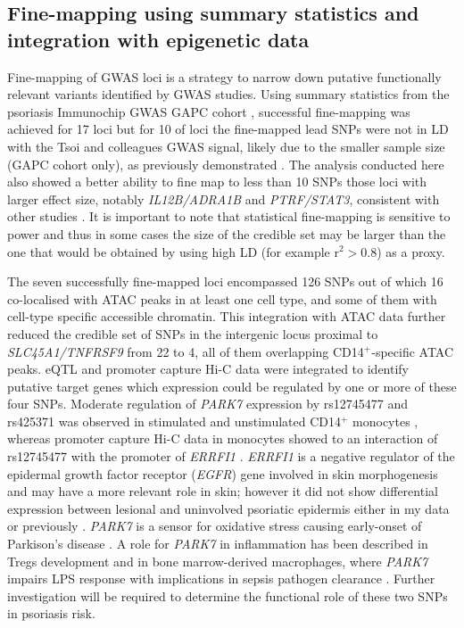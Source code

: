 \subsection{Fine-mapping using summary statistics and integration with epigenetic data} 

Fine-mapping of GWAS loci is a strategy to narrow down putative functionally relevant variants identified by GWAS studies. Using summary statistics from the psoriasis Immunochip GWAS GAPC cohort  \parencite{Tsoi2012}, successful fine-mapping was achieved for 17 loci but for 10 of loci the fine-mapped lead SNPs were not in LD with the Tsoi and colleagues GWAS signal, likely due to the smaller sample size (GAPC cohort only), as previously demonstrated \parencite{Bunt2015}. The analysis conducted here also showed a better ability to fine map to less than 10 SNPs those loci with larger effect size, notably \textit{IL12B/ADRA1B} and \textit{PTRF/STAT3}, consistent with other studies \parencite{Bunt2015}. It is important to note that statistical fine-mapping is sensitive to power and thus in some cases the size of the credible set may be larger than the one that would be obtained by using high LD (for example r$^{2}>$0.8) as a proxy. %

The seven successfully fine-mapped loci encompassed 126 SNPs out of which 16 co-localised with ATAC peaks in at least one cell type, and some of them with cell-type specific accessible chromatin. This integration with ATAC data further reduced the credible set of SNPs in the intergenic locus proximal to \textit{SLC45A1/TNFRSF9} from 22 to 4, all of them overlapping CD14$^+$-specific ATAC peaks. eQTL and promoter capture Hi-C data were integrated to identify putative target genes which expression could be regulated by one or more of these four SNPs. Moderate regulation of \textit{PARK7} expression by rs12745477 and rs425371 was observed in stimulated and unstimulated CD14$^+$ monocytes \parencite{Fairfax2014}, whereas promoter capture Hi-C data in monocytes showed to an interaction of rs12745477 with the promoter of \textit{ERRFI1} \parencite{Javierre2016}. \textit{ERRFI1} is a negative regulator of the epidermal growth factor receptor (\textit{EGFR}) gene involved in skin morphogenesis \parencite{Ferby2006} and may have a more relevant role in skin; however it did not show differential expression between lesional and uninvolved psoriatic epidermis either in my data or previously \parencite{Tsoi2015,Tervaniemi2016}. \textit{PARK7} is a sensor for oxidative stress causing early-onset of Parkison's disease \parencite{Bonifati2003}. A role for \textit{PARK7} in inflammation has been described in Tregs development and in bone marrow-derived macrophages, where \textit{PARK7} impairs LPS response with implications in sepsis pathogen clearance \parencite{Singh2015,Amatullah2017}.  Further investigation will be required to determine the functional role of these two SNPs in psoriasis risk. 

